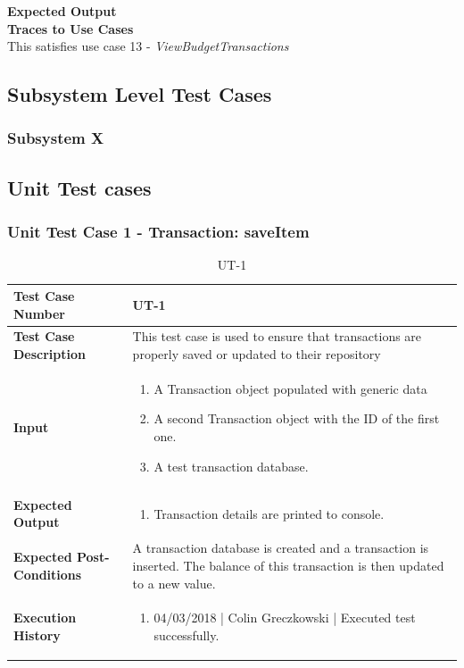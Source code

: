 \documentclass[12pt]{article}
\begin{document}
\noindent
{\bf Expected Output}\\

\noindent
{\bf Traces to Use Cases}\\
This satisfies use case 13 - \textit{ViewBudgetTransactions}


\subsection{Subsystem Level Test Cases}

\subsubsection{Subsystem X}
\clearpage
\subsection{Unit Test cases}

\subsubsection{Unit Test Case 1 - Transaction: saveItem}
\def\arraystretch{1.5}%
\begin{table}[htbp]
\centering
\caption {UT-1}
\label{UT-1}
\begin{tabularx}{\textwidth}{ | l | X |}
\hline
\textbf{Test Case Number}      &  UT-1                         \\ \hline
\textbf{Test Case Description}    &  This test case is used to ensure that transactions are properly saved or updated to their repository                \\ \hline
\textbf{Input}         & 	\begin{enumerate}
	\item A Transaction object populated with generic data
          \item A second Transaction object with the ID of the first one.
	\item A test transaction database.
\end{enumerate} \\ \hline

\textbf{Expected Output}     & \begin{enumerate}
	\item Transaction details are printed to console.
\end{enumerate} \\ \hline
\textbf{Expected Post-Conditions}           &  A transaction database is created and a transaction is inserted. The balance of this transaction is then updated to a new value.                   \\ \hline
\textbf{Execution History}   &  \begin{enumerate}
	\item 04/03/2018 | Colin Greczkowski | Executed test successfully.
\end {enumerate} \\ \hline
\end{tabularx}
\end{table}
\clearpage
\end{document}
